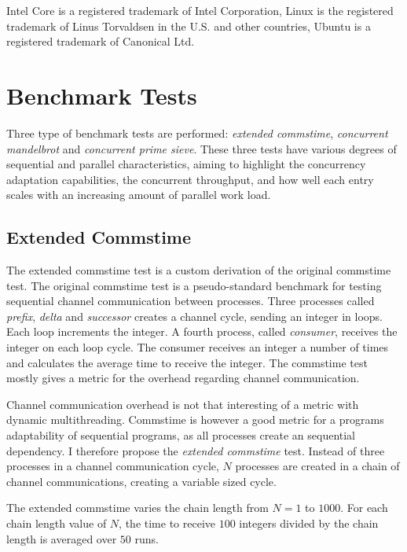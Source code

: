 Intel Core is a registered trademark of Intel Corporation, Linux is the registered trademark of Linus Torvaldsen in the U.S. and other countries, Ubuntu is a registered trademark of Canonical Ltd.


\section{Benchmark Tests}
\label{sec:benchmark_tests}


Three type of benchmark tests are performed: \textit{extended commstime}, \textit{concurrent mandelbrot} and \textit{concurrent prime sieve}. These three tests have various degrees of sequential and parallel characteristics, aiming to highlight the concurrency adaptation capabilities, the concurrent throughput, and how well each entry scales with an increasing amount of parallel work load.


\subsection{Extended Commstime}


The extended commstime test is a custom derivation of the original commstime test. The original commstime test \citep{roger2001commstime} is a pseudo\hyp{}standard benchmark for testing sequential channel communication between processes. Three processes called \textit{prefix}, \textit{delta} and \textit{successor} creates a channel cycle, sending an integer in loops. Each loop increments the integer. A fourth process, called \textit{consumer}, receives the integer on each loop cycle. The consumer receives an integer a number of times and calculates the average time to receive the integer. The commstime test mostly gives a metric for the overhead regarding channel communication.

Channel communication overhead is not that interesting of a metric with dynamic multithreading. Commstime is however a good metric for a programs adaptability of sequential programs, as all processes create an sequential dependency. I therefore propose the \textit{extended commstime} test. Instead of three processes in a channel communication cycle, $N$ processes are created in a chain of channel communications, creating a variable sized cycle.

The extended commstime varies the chain length from $N=1$ to $1000$. For each chain length value of $N$, the time to receive $100$ integers divided by the chain length is averaged over $50$ runs. 

